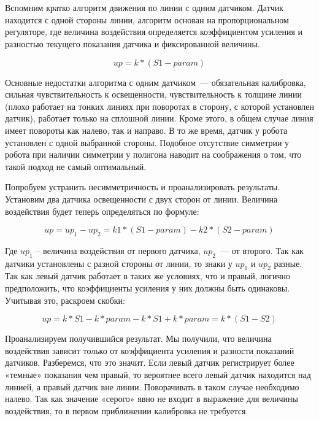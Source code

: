 {\hypertarget{lesson17x4}{}}\\\\

Вспомним кратко алгоритм движения по линии с одним датчиком. Датчик находится с одной стороны линии, алгоритм основан на пропорциональном регуляторе, где величина воздействия определяется коэффициентом усиления и разностью текущего показания датчика и фиксированной величины.

\begin{equation}
up=k*(S1-param)
\end{equation}	

Основные недостатки алгоритма с одним датчиком~--- обязательная калибровка, сильная чувствительность к освещенности, чувствительность к толщине линии (плохо работает на тонких линиях при поворотах в сторону, с которой установлен датчик), работает только на сплошной линии. Кроме этого, в общем случае линия имеет повороты как налево, так и направо. В то же время, датчик у робота установлен с одной выбранной стороны. Подобное отсутствие симметрии у робота при наличии симметрии у полигона наводит на соображения о том, что такой подход не самый оптимальный.

Попробуем устранить несимметричность и проанализировать результаты. Установим два датчика освещенности с двух сторон от линии. Величина воздействия будет теперь определяться по формуле:

\begin{equation}
up=up_1-up_2=k1*(S1-param)-k2*(S2-param)
\end{equation}	

Где \(up_1\) – величина воздействия от первого датчика, \(up_2\)~--- от второго. Так как датчики установлены с разной стороны от линии, то знаки у \(up_1\) и \(up_2\) разные. Так как левый датчик работает в таких же условиях, что и правый, логично предположить, что коэффициенты усиления у них должны быть одинаковы. Учитывая это, раскроем скобки:

\begin{equation}
up=k*S1-k*param-k*S1+k*param=k*(S1-S2)
\end{equation}	

Проанализируем получившийся результат. Мы получили, что величина воздействия зависит только от коэффициента усиления и разности показаний датчиков. Разберемся, что это значит. Если левый датчик регистрирует более «темные» показания чем правый, то вероятнее всего левый датчик находится над линией, а правый датчик вне линии. Поворачивать в таком случае необходимо налево. Так как значение «серого» явно не входит в выражение для величины воздействия, то в первом приближении калибровка не требуется. 

